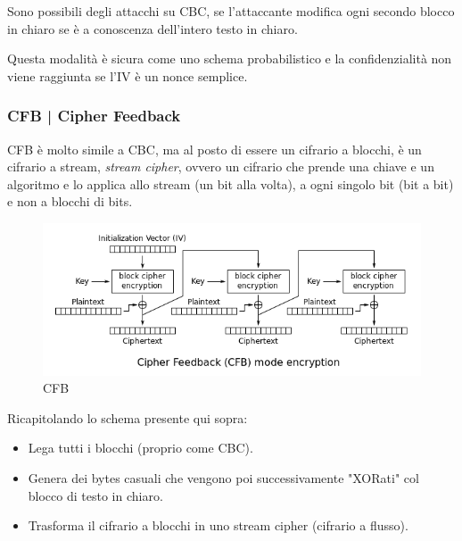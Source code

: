 \textsf{\small Sono possibili degli attacchi su CBC, se l'attaccante modifica ogni secondo blocco in chiaro se è a conoscenza dell'intero testo in chiaro.}

  

\textsf{\small Questa modalità è sicura come uno schema probabilistico e la confidenzialità non viene raggiunta se l'IV è un nonce semplice.} %

\subsubsection{CFB | Cipher Feedback}

   

\textsf{\small CFB è molto simile a CBC, ma al posto di essere un cifrario a blocchi, è un cifrario a stream, \emph{stream cipher}, ovvero un cifrario che prende una chiave e un algoritmo e lo applica allo stream (un bit alla volta), a ogni singolo bit (bit a bit) e non a blocchi di bits.}

\begin{figure}[H]
	\centering
	\includegraphics[width=1\textwidth, height=1\textheight, keepaspectratio]{./images/aes_modes/cfb.png}
	\caption{CFB}
	\label{fig:cfb}
\end{figure}

\textsf{\small Ricapitolando lo schema presente qui sopra:}

   

\begin{itemize}
	\item \textsf{\small Lega tutti i blocchi (proprio come CBC).}
	\item \textsf{\small Genera dei bytes casuali che vengono poi successivamente "XORati" col blocco di testo in chiaro.}
	\item \textsf{\small Trasforma il cifrario a blocchi in uno stream cipher (cifrario a flusso).}
\end{itemize}

